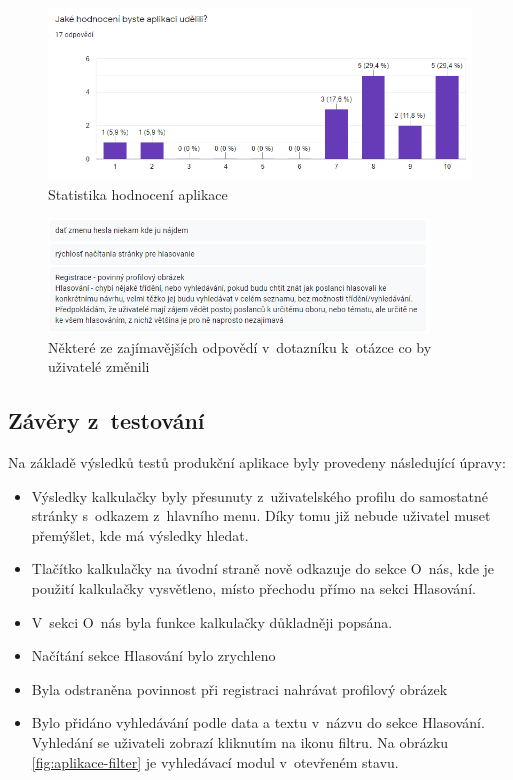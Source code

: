 \begin{figure}[H]
    \centering
    \includegraphics[width=1\textwidth]{obrazky-figures/dotaznik-hodnoceni.png}
    \caption{Statistika hodnocení aplikace}
    \label{fig:dotaznik-hodnoceni}
\end{figure}

\begin{figure}[H]
    \centering
    \includegraphics[width=0.9\textwidth]{obrazky-figures/dotaznik-zmeny.png}
    \caption{Některé ze zajímavějších odpovědí v~dotazníku k~otázce co by uživatelé změnili}
    \label{fig:dotaznik-zmeny}
\end{figure}

\subsection{Závěry z~testování} 
Na základě výsledků testů produkční aplikace byly provedeny následující úpravy: 
\begin{itemize}
    \item Výsledky kalkulačky byly přesunuty z~uživatelského profilu do samostatné stránky s~odkazem z~hlavního menu. Díky tomu již nebude uživatel muset přemýšlet, kde má výsledky hledat. \item Tlačítko kalkulačky na úvodní straně nově odkazuje do sekce O~nás, kde je použití kalkulačky vysvětleno, místo přechodu přímo na sekci Hlasování.
    \item V~sekci O~nás byla funkce kalkulačky důkladněji popsána.
    \item Načítání sekce Hlasování bylo zrychleno
    \item Byla odstraněna povinnost při registraci nahrávat profilový obrázek
    \item Bylo přidáno vyhledávání podle data a textu v~názvu do sekce Hlasování. Vyhledání se uživateli zobrazí kliknutím na ikonu filtru. Na obrázku \ref{fig:aplikace-filter} je vyhledávací modul v~otevřeném stavu.
\end{itemize}


